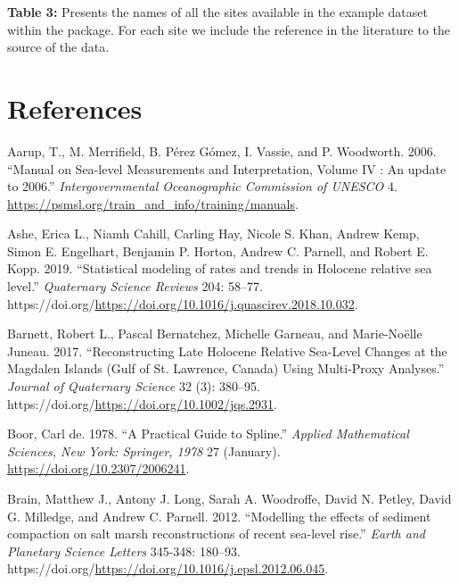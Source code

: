 \textbf{Table 3:} Presents the names of all the sites available in the example dataset within the  package. For each site we include the reference in the literature to the source of the data.

\hypertarget{references}{%
\section*{References}\label{references}}

\hypertarget{refs}{}
\begin{CSLReferences}{1}{0}
\leavevmode{}%
Aarup, T., M. Merrifield, B. Pérez Gómez, I. Vassie, and P. Woodworth. 2006. {``{Manual on Sea-level Measurements and Interpretation, Volume IV : An update to 2006.}''} \emph{Intergovernmental Oceanographic Commission of UNESCO} 4. \url{https://psmsl.org/train_and_info/training/manuals}.

\leavevmode{}%
Ashe, Erica L., Niamh Cahill, Carling Hay, Nicole S. Khan, Andrew Kemp, Simon E. Engelhart, Benjamin P. Horton, Andrew C. Parnell, and Robert E. Kopp. 2019. {``{Statistical modeling of rates and trends in Holocene relative sea level}.''} \emph{Quaternary Science Reviews} 204: 58--77. https://doi.org/\url{https://doi.org/10.1016/j.quascirev.2018.10.032}.

\leavevmode{}%
Barnett, Robert L., Pascal Bernatchez, Michelle Garneau, and Marie-Noëlle Juneau. 2017. {``Reconstructing Late {H}olocene Relative Sea-Level Changes at the {M}agdalen {I}slands ({G}ulf of {S}t. {L}awrence, {C}anada) Using Multi-Proxy Analyses.''} \emph{Journal of Quaternary Science} 32 (3): 380--95. https://doi.org/\url{https://doi.org/10.1002/jqs.2931}.

\leavevmode{}%
Boor, Carl de. 1978. {``A {P}ractical {G}uide to {S}pline.''} \emph{Applied Mathematical Sciences, New York: Springer, 1978} 27 (January). \url{https://doi.org/10.2307/2006241}.

\leavevmode{}%
Brain, Matthew J., Antony J. Long, Sarah A. Woodroffe, David N. Petley, David G. Milledge, and Andrew C. Parnell. 2012. {``{Modelling the effects of sediment compaction on salt marsh reconstructions of recent sea-level rise}.''} \emph{Earth and Planetary Science Letters} 345-348: 180--93. https://doi.org/\url{https://doi.org/10.1016/j.epsl.2012.06.045}.


\end{CSLReferences}
